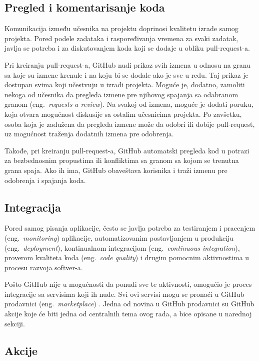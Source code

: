 \documentclass[12pt]{report}
\begin{document}
\subsection{Pregled i komentarisanje koda}
Komunikacija između učesnika na projektu doprinosi kvalitetu izrade samog projekta. Pored podele zadataka i raspoređivanja vremena za svaki zadatak, javlja se potreba i za diskutovanjem koda koji se dodaje u obliku pull-request-a.

Pri kreiranju pull-request-a, GitHub nudi prikaz svih izmena u odnosu na granu sa koje su izmene krenule i na koju bi se dodale ako je sve u redu. Taj prikaz je dostupan svima koji učestvuju u izradi projekta. Moguće je, dodatno, zamoliti nekoga od učesnika da pregleda izmene pre njihovog spajanja sa odabranom granom (eng.\ \textit{requests a review}). Na svakoj od izmena, moguće je dodati poruku, koja otvara mogućnost diskusije sa ostalim učesnicima projekta. Po zavšetku, osoba koja je zadužena da pregleda izmene može da odobri ili dobije pull-request, uz mogućnost traženja dodatnih izmena pre odobrenja.

Takođe, pri kreiranju pull-request-a, GitHub automatski pregleda kod u potrazi za bezbednosnim propustima ili konfliktima sa granom sa kojom se trenutna grana spaja. Ako ih ima, GitHub obaveštava korisnika i traži izmenu pre odobrenja i spajanja koda.

\subsection{Integracija}
Pored samog pisanja aplikacije, često se javlja potreba za testiranjem i pracenjem (eng.\ \textit{monitoring}) aplikacije, automatizovanim postavljanjem u produkciju (eng.\ \textit{deployment}), kontinualnom integracijom (eng.\ \textit{continuous integration}), proverom kvaliteta koda (eng.\ \textit{code quality}) i drugim pomocnim aktivnostima u procesu razvoja softver-a.

Pošto GitHub nije u mogućnosti da ponudi sve te aktivnosti, omogućio je proces integracije sa servisima koji ih nude. Svi ovi servisi mogu se pronaći u GitHub prodavnici (eng.\ \textit{marketplace}) \cite{marketplace}. Jedna od novina u GitHub prodavnici su GitHub akcije koje će biti jedna od centralnih tema ovog rada, a bice opisane u narednoj sekciji.

\subsection{Akcije}
\end{document}
